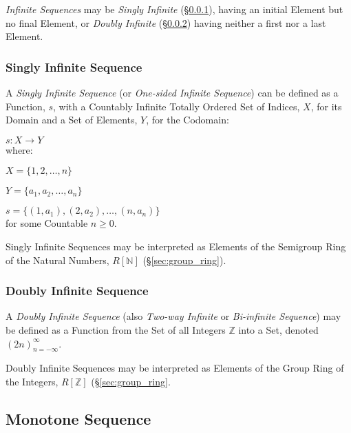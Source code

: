 \emph{Infinite Sequences} may be \emph{Singly Infinite}
(\S\ref{sec:singly_infinite}), having an initial Element but no final
Element, or \emph{Doubly Infinite} (\S\ref{sec:doubly_infinite})
having neither a first nor a last Element.



\subsubsection{Singly Infinite Sequence}\label{sec:singly_infinite}

A \emph{Singly Infinite Sequence} (or \emph{One-sided Infinite
  Sequence}) can be defined as a Function, $s$, with a Countably
Infinite Totally Ordered Set of Indices, $X$, for its Domain and a Set
of Elements, $Y$, for the Codomain:

  $s : X \rightarrow Y$ \\
where:

  $X = \{1,2,\ldots,n\}$

  $Y = \{a_1, a_2,\ldots,a_n\}$

  $s = \{(1,a_1), (2,a_2),\ldots, (n,a_n)\}$ \\
for some Countable $n \geq 0$.

Singly Infinite Sequences may be interpreted as Elements of the
Semigroup Ring of the Natural Numbers, $R[\mathbb{N}]$
(\S\ref{sec:group_ring}).



\subsubsection{Doubly Infinite Sequence}\label{sec:doubly_infinite}

A \emph{Doubly Infinite Sequence} (also \emph{Two-way Infinite} or
\emph{Bi-infinite Sequence}) may be defined as a Function from the Set
of all Integers $\mathbb{Z}$ into a Set, denoted
$(2n)^{\infty}_{n=-\infty}$.

Doubly Infinite Sequences may be interpreted as Elements of the Group
Ring of the Integers, $R[\mathbb{Z}]$ (\S\ref{sec:group_ring}.



\subsection{Monotone Sequence}\label{sec:monotone_sequence}

